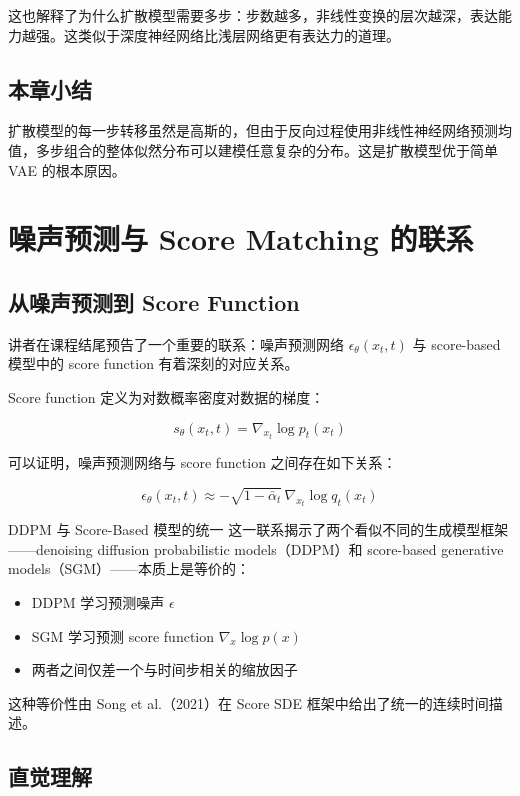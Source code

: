 \documentclass[a4paper]{article}
\begin{document}
这也解释了为什么扩散模型需要多步：步数越多，非线性变换的层次越深，表达能力越强。这类似于深度神经网络比浅层网络更有表达力的道理。

\subsection{本章小结}

扩散模型的每一步转移虽然是高斯的，但由于反向过程使用非线性神经网络预测均值，多步组合的整体似然分布可以建模任意复杂的分布。这是扩散模型优于简单 VAE 的根本原因。


\section{噪声预测与 Score Matching 的联系}

\subsection{从噪声预测到 Score Function}

讲者在课程结尾预告了一个重要的联系：噪声预测网络 $\epsilon_\theta(x_t, t)$ 与 score-based 模型中的 score function 有着深刻的对应关系。

Score function 定义为对数概率密度对数据的梯度：

$$s_\theta(x_t, t) = \nabla_{x_t} \log p_t(x_t)$$

可以证明，噪声预测网络与 score function 之间存在如下关系：

$$\epsilon_\theta(x_t, t) \approx -\sqrt{1 - \bar{\alpha}_t}\, \nabla_{x_t} \log q_t(x_t)$$

\begin{knowledgebox}{DDPM 与 Score-Based 模型的统一}
这一联系揭示了两个看似不同的生成模型框架——denoising diffusion probabilistic models（DDPM）和 score-based generative models（SGM）——本质上是等价的：
\begin{itemize}
    \item DDPM 学习预测噪声 $\epsilon$
    \item SGM 学习预测 score function $\nabla_x \log p(x)$
    \item 两者之间仅差一个与时间步相关的缩放因子
\end{itemize}
这种等价性由 Song et al.（2021）在 Score SDE 框架中给出了统一的连续时间描述。
\end{knowledgebox}

\subsection{直觉理解}
\end{document}
